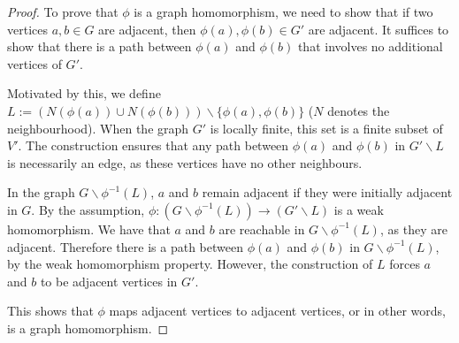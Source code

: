 \begin{proof}
To prove that $\phi$ is a graph homomorphism, we need to show that if two vertices $a, b \in G$ are adjacent, then $\phi(a), \phi(b) \in G'$ are adjacent. It suffices to show that there is a path between $\phi(a)$ and $\phi(b)$ that involves no additional vertices of $G'$.

Motivated by this, we define $L := (N(\phi(a)) \cup N(\phi(b))) \backslash \{\phi(a), \phi(b)\}$ ($N$ denotes the neighbourhood). When the graph $G'$ is locally finite, this set is a finite subset of $V'$. The construction ensures that any path between $\phi(a)$ and $\phi(b)$ in $G' \backslash L$ is necessarily an edge, as these vertices have no other neighbours.

In the graph $G \backslash \phi^{-1}(L)$, $a$ and $b$ remain adjacent if they were initially adjacent in $G$. By the assumption, $\phi : (G \backslash \phi^{-1}(L)) \to (G' \backslash L)$ is a weak homomorphism. We have that $a$ and $b$ are reachable in $G \backslash \phi^{-1}(L)$, as they are adjacent. Therefore there is a path between $\phi(a)$ and $\phi(b)$ in $G \backslash \phi^{-1}(L)$, by the weak homomorphism property. However, the construction of $L$ forces $a$ and $b$ to be adjacent vertices in $G'$.

This shows that $\phi$ maps adjacent vertices to adjacent vertices, or in other words, is a graph homomorphism.
\end{proof}




